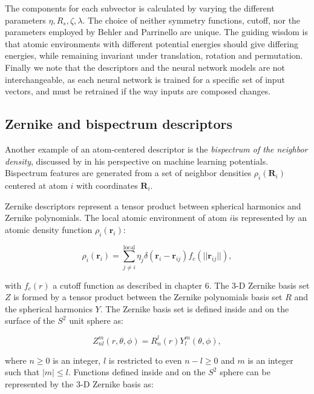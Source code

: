 The components for each subvector is calculated by varying
the different parameters $\eta, R_s, \zeta, \lambda$.
The choice of neither symmetry functions, cutoff, nor the parameters
employed by Behler and Parrinello are unique. The guiding
wisdom is that atomic environments with different
potential energies should give differing energies,
while remaining invariant under translation, rotation and permutation.
Finally we note that the descriptors and the neural network
models are not interchangeable, as each neural network
is trained for a specific set of input vectors, and must
be retrained if the way inputs are composed changes.

\subsection{Zernike and bispectrum descriptors}
Another example of an atom-centered descriptor
is the \textit{bispectrum of the neighbor density},
discussed by \parencite[Behler, J\"{o}rg]{behler2016perspective}
in his perspective on machine learning potentials.
Bispectrum features are generated from a set of neighbor
densities $\rho_i(\bm{R}_i)$ centered at atom $i$
with coordinates $\bm{R}_i$.

Zernike descriptors represent a tensor product between spherical
harmonics and Zernike polynomials. The local atomic environment
of atom $i$is represented by an atomic density function $\rho_i(\bm{r}_i)$:

\begin{equation}
 \rho_i(\bm{r}_i) = \sum_{j\neq i}^{\text{local}}
    \eta_j \delta \left( \bm{r}_i - \bm{r}_{ij} \right)
    f_c \left( \lvert \lvert \bm{r}_{ij} \rvert \rvert \right) , 
\end{equation}

with $f_c(r)$ a cutoff function as described in chapter 6.
The 3-D Zernike basis set $Z$ is formed by a tensor product between
the Zernike polynomials basis set $R$ and the spherical harmonics
$Y$. The Zernike basis set is defined inside and on the surface
of the $S^2$ unit sphere as:

\begin{equation}
 Z_{nl}^m (r, \theta, \phi) = R_n^l(r) Y_l^m(\theta, \phi) , 
\end{equation}

where $n \geq 0$ is an integer, $l$ is restricted to even $n - l \geq 0$
and $m$ is an integer such that $\left| m \right| \leq l$.
Functions defined inside and on the $S^2$ sphere
can be represented by the 3-D Zernike basis as:

